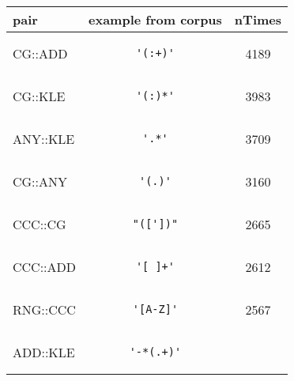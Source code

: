 \begin{center}
\begin{table}
\caption{ \label{}}
\begin{tabular}{lcc}
\toprule
pair & example from corpus & nTimes \\ 
\midrule
CG::ADD & \begin{minipage}{2in}
\begin{verbatim}
'(:+)'\end{verbatim}
\end{minipage}
& 4189 \\ 
\midrule
CG::KLE & \begin{minipage}{2in}
\begin{verbatim}
'(:)*'\end{verbatim}
\end{minipage}
& 3983 \\ 
\midrule
ANY::KLE & \begin{minipage}{2in}
\begin{verbatim}
'.*'\end{verbatim}
\end{minipage}
& 3709 \\ 
\midrule
CG::ANY & \begin{minipage}{2in}
\begin{verbatim}
'(.)'\end{verbatim}
\end{minipage}
& 3160 \\ 
\midrule
CCC::CG & \begin{minipage}{2in}
\begin{verbatim}
"(['])"\end{verbatim}
\end{minipage}
& 2665 \\ 
\midrule
CCC::ADD & \begin{minipage}{2in}
\begin{verbatim}
'[ ]+'\end{verbatim}
\end{minipage}
& 2612 \\ 
\midrule
RNG::CCC & \begin{minipage}{2in}
\begin{verbatim}
'[A-Z]'\end{verbatim}
\end{minipage}
& 2567 \\ 
\midrule
ADD::KLE & \begin{minipage}{2in}
\begin{verbatim}
'-*(.+)'\end{verbatim}

\end{minipage}
\end{tabular}
\end{table}
\end{center}
